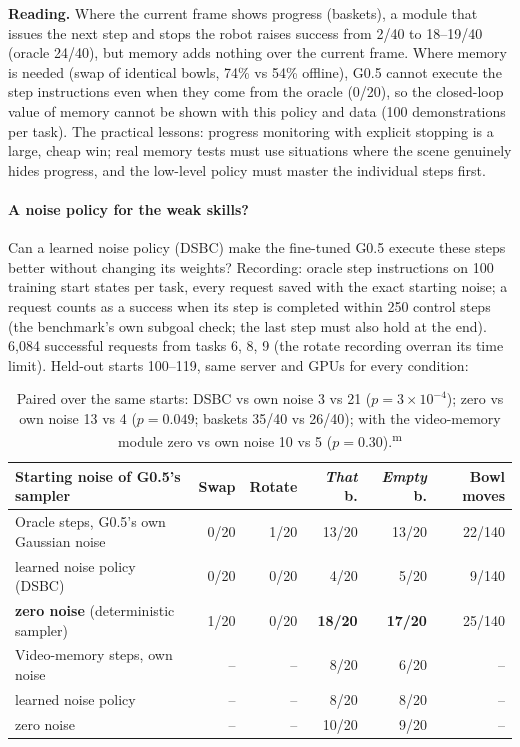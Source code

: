 \documentclass[10pt,a4paper]{article}
\DeclareRobustCommand{\meas}{\textsuperscript{\textcolor{green!50!black}{m}}}
\begin{document}
\noindent\textbf{Reading.} Where the current frame shows progress (baskets), a module that issues the next step and stops the robot raises success from 2/40 to 18--19/40 (oracle 24/40), but memory adds nothing over the current frame. Where memory is needed (swap of identical bowls, 74\% vs 54\% offline), G0.5 cannot execute the step instructions even when they come from the oracle (0/20), so the closed-loop value of memory cannot be shown with this policy and data (100 demonstrations per task). The practical lessons: progress monitoring with explicit stopping is a large, cheap win; real memory tests must use situations where the scene genuinely hides progress, and the low-level policy must master the individual steps first.

\paragraph{A noise policy for the weak skills?} Can a learned noise policy (DSBC) make the fine-tuned G0.5 execute these steps better without changing its weights? Recording: oracle step instructions on 100 training start states per task, every request saved with the exact starting noise; a request counts as a success when its step is completed within 250 control steps (the benchmark's own subgoal check; the last step must also hold at the end). 6,084 successful requests from tasks 6, 8, 9 (the rotate recording overran its time limit). Held-out starts 100--119, same server and GPUs for every condition:
\begin{table}[H]\centering\small
\begin{tabular}{lrrrrr}
\toprule
Starting noise of G0.5's sampler & Swap & Rotate & \emph{That} b. & \emph{Empty} b. & Bowl moves \\
\midrule
Oracle steps, G0.5's own Gaussian noise & 0/20 & 1/20 & 13/20 & 13/20 & 22/140 \\
\quad learned noise policy (DSBC) & 0/20 & 0/20 & 4/20 & 5/20 & 9/140 \\
\quad \textbf{zero noise} (deterministic sampler) & 1/20 & 0/20 & \textbf{18/20} & \textbf{17/20} & 25/140 \\
Video-memory steps, own noise & -- & -- & 8/20 & 6/20 & -- \\
\quad learned noise policy & -- & -- & 8/20 & 8/20 & -- \\
\quad zero noise & -- & -- & 10/20 & 9/20 & -- \\
\bottomrule
\end{tabular}
\caption{Paired over the same starts: DSBC vs own noise 3 vs 21 ($p=3\times10^{-4}$); zero vs own noise 13 vs 4 ($p=0.049$; baskets 35/40 vs 26/40); with the video-memory module zero vs own noise 10 vs 5 ($p=0.30$).\meas}
\end{table}
\end{document}
